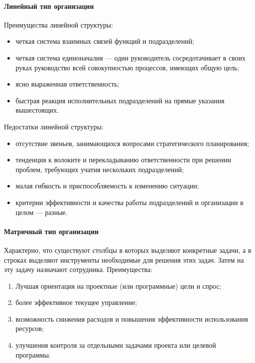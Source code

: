 \paragraph{Линейный тип организации}\mbox{}\par
Преимущества линейной структуры:
\begin{itemize}
  \item четкая система взаимных связей функций и подразделений;
  \item четкая система единоначалия --- один руководитель сосредотачивает в
    своих руках руководство всей совокупностью процессов, имеющих общую цель;
  \item ясно выраженная ответственность;
  \item быстрая реакция исполнительных подразделений на прямые указания
    вышестоящих.
\end{itemize}

Недостатки линейной структуры:
\begin{itemize}
  \item отсутствие звеньев, занимающихся вопросами стратегического планирования;
  \item тенденция к волоките и перекладыванию ответственности при решении
    проблем, требующих учатия нескольких подразделений;
  \item малая гибкость и приспособляемость к изменению ситуации;
  \item критерии эффективности и качества работы подразделений и организации в
    целом --- разные.
\end{itemize}

\paragraph{Матричный тип организации}\mbox{}\par
Характерно, что существуют столбцы в которых выделяют конкретные задачи, а в
строках выделяют инструменты необходимые для решения этих задач. Затем на эту
задачу назначают сотрудника. %
Преимущества:
\begin{enumerate}
  \item Лучшая ориентация на проектные (или программные) цели и спрос;
  \item более эффективное текущее управление;
  \item возможность снижения расходов и повышения эффективности использования
    ресурсов;
  \item улучшения контроля за отдельными задачами проекта или целевой программы.
\end{enumerate}

